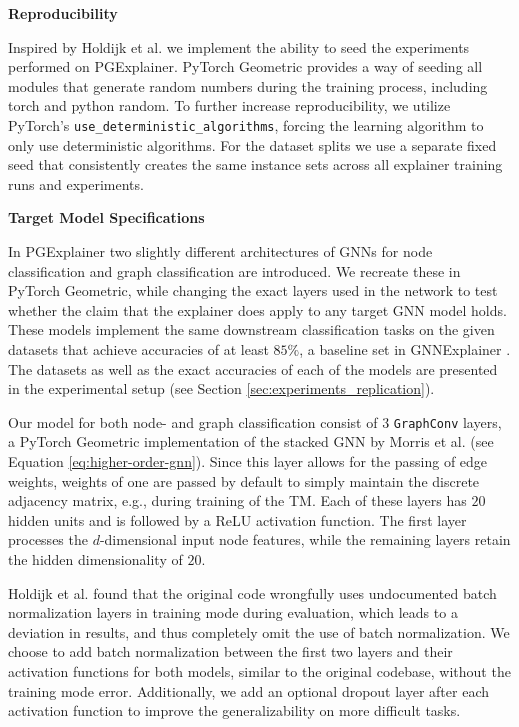 \textbf{Reproducibility}\par
 Inspired by Holdijk et al. \cite{holdijk2021re} we implement the ability to seed the experiments performed on PGExplainer. PyTorch Geometric provides a way of seeding all modules that generate random numbers during the training process, including torch and python random.
To further increase reproducibility, we utilize PyTorch's \lstinline|use_deterministic_algorithms|, forcing the learning algorithm to only use deterministic algorithms. For the dataset splits we use a separate fixed seed that consistently creates the same instance sets across all explainer training runs and experiments.\bigskip

\textbf{Target Model Specifications}\par
 In PGExplainer two slightly different architectures of GNNs for node classification and graph classification are introduced. We recreate these in PyTorch Geometric, while changing the exact layers used in the network to test whether the claim that the explainer does apply to any target GNN model holds. These models implement the same downstream classification tasks on the given datasets that achieve accuracies of at least $85\%$, a baseline set in GNNExplainer \cite{ying2019gnnexplainer}. The datasets as well as the exact accuracies of each of the models are presented in the experimental setup (see Section \ref{sec:experiments_replication}). 

Our model for both node- and graph classification consist of $3$ \lstinline|GraphConv| layers, a PyTorch Geometric implementation of the stacked GNN by Morris et al. \cite{morris2019weisfeiler} (see Equation \ref{eq:higher-order-gnn}). Since this layer allows for the passing of edge weights, weights of one are passed by default to simply maintain the discrete adjacency matrix, e.g., during training of the \ac{TM}. Each of these layers has $20$ hidden units and is followed by a ReLU activation function. The first layer processes the $d$-dimensional input node features, while the remaining layers retain the hidden dimensionality of $20$.

Holdijk et al. \cite{holdijk2021re} found that the original code wrongfully uses undocumented batch normalization layers in training mode during evaluation, which leads to a deviation in results, and thus completely omit the use of batch normalization. We choose to add batch normalization between the first two layers and their activation functions for both models, similar to the original codebase, without the training mode error. Additionally, we add an optional dropout layer after each activation function to improve the generalizability on more difficult tasks. \bigskip



